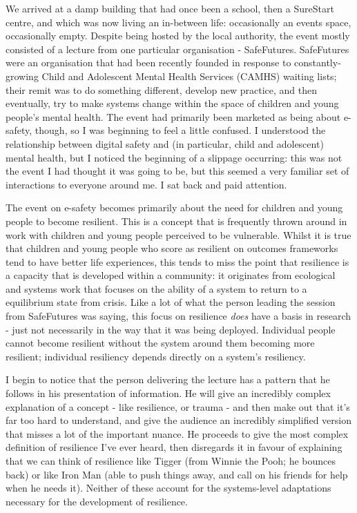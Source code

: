 We arrived at a damp building that had once been a school, then a SureStart centre, and which was now living an in-between life: occasionally an events space, occasionally empty. Despite being hosted by the local authority, the event mostly consisted of a lecture from one particular organisation - SafeFutures. SafeFutures were an organisation that had been recently founded in response to constantly-growing Child and Adolescent Mental Health Services (CAMHS) waiting lists; their remit was to do something different, develop new practice, and then eventually, try to make systems change within the space of children and young people's mental health. The event had primarily been marketed as being about e-safety, though, so I was beginning to feel a little confused. I understood the relationship between digital safety and (in particular, child and adolescent) mental health, but I noticed the beginning of a slippage occurring: this was not the event I had thought it was going to be, but this seemed a very familiar set of interactions to everyone around me. I sat back and paid attention. 

The event on e-safety becomes primarily about the need for children and young people to become resilient. This is a concept that is frequently thrown around in work with children and young people perceived to be vulnerable. Whilst it is true that children and young people who score as resilient on outcomes frameworks tend to have better life experiences, this tends to miss the point that resilience is a capacity that is developed within a community: it originates from ecological and systems work that focuses on the ability of a system to return to a equilibrium state from crisis. 
Like a lot of what the person leading the session from SafeFutures was saying, this focus on resilience \textit{does} have a basis in research - just not necessarily in the way that it was being deployed. Individual people cannot become resilient without the system around them becoming more resilient; individual resiliency depends directly on a system's resiliency. 

I begin to notice that the person delivering the lecture has a pattern that he follows in his presentation of information. He will give an incredibly complex explanation of a concept - like resilience, or trauma - and then make out that it's far too hard to understand, and give the audience an incredibly simplified version that misses a lot of the important nuance. He proceeds to give the most complex definition of resilience I've ever heard, then disregards it in favour of explaining that we can think of resilience like Tigger (from Winnie the Pooh; he bounces back) or like Iron Man (able to push things away, and call on his friends for help when he needs it). Neither of these account for the systems-level adaptations necessary for the development of resilience.

